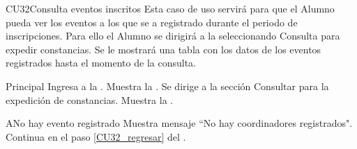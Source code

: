 \begin{UseCase}{CU32}{Consulta eventos inscritos}{
		\noindent Esta caso de uso servirá para que el Alumno pueda ver los eventos a los que se a registrado durante el periodo de inscripciones.
		Para ello el Alumno se dirigirá a la  seleccionando Consulta para expedir constancias. Se le mostrará una tabla con los datos de los eventos registrados hasta el momento de la consulta.
	} \label{CU32_evento}

		\end{UseCase}
	
    \begin{UCtrayectoria}{Principal}
    \UCpaso[\UCactor] Ingresa a la .
    \UCpaso Muestra la . \label{CU32_regresar}
    \UCpaso[\UCactor] Se dirige a la sección Consultar para la expedición de constancias.  
    \UCpaso Muestra la . 
    \end{UCtrayectoria}
    
    \begin{UCtrayectoriaA}{A}{No hay evento registrado}
    	\UCpaso Muestra mensaje “No hay coordinadores registrados".
    	\UCpaso Continua en el paso \ref{CU32_regresar} del .
    \end{UCtrayectoriaA}


	


